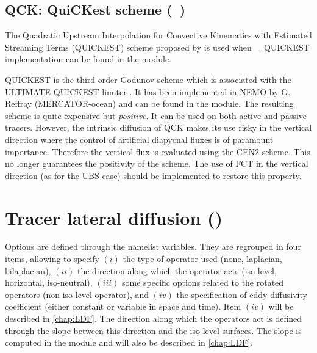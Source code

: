 \documentclass[../main/NEMO_manual]{subfiles}
\begin{document}
\subsection{QCK: QuiCKest scheme (\protect{}~)}
\label{subsec:TRA_adv_qck}

The Quadratic Upstream Interpolation for Convective Kinematics with Estimated Streaming Terms (QUICKEST) scheme
proposed by \citet{Leonard1979} is used when ~.
QUICKEST implementation can be found in the  module.

QUICKEST is the third order Godunov scheme which is associated with the ULTIMATE QUICKEST limiter
\citep{Leonard1991}.
It has been implemented in NEMO by G. Reffray (MERCATOR-ocean) and can be found in the  module.
The resulting scheme is quite expensive but \textit{positive}.
It can be used on both active and passive tracers.
However, the intrinsic diffusion of QCK makes its use risky in the vertical direction where
the control of artificial diapycnal fluxes is of paramount importance.
Therefore the vertical flux is evaluated using the CEN2 scheme.
This no longer guarantees the positivity of the scheme.
The use of FCT in the vertical direction (as for the UBS case) should be implemented to restore this property.


\section{Tracer lateral diffusion (\protect{})}
\label{sec:TRA_ldf}

 
Options are defined through the  namelist variables.
They are regrouped in four items, allowing to specify 
$(i)$   the type of operator used (none, laplacian, bilaplacian),
$(ii)$  the direction along which the operator acts (iso-level, horizontal, iso-neutral),
$(iii)$ some specific options related to the rotated operators (\ie non-iso-level operator), and
$(iv)$  the specification of eddy diffusivity coefficient (either constant or variable in space and time).
Item $(iv)$ will be described in \autoref{chap:LDF}.
The direction along which the operators act is defined through the slope between
this direction and the iso-level surfaces.
The slope is computed in the  module and will also be described in \autoref{chap:LDF}.
\end{document}
